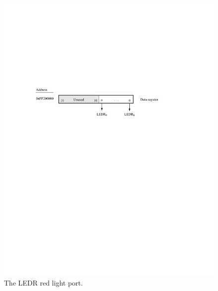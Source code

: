 \documentclass[epsfig,10pt,fullpage]{article}
\begin{document}
\begin{figure}[H]
   \begin{center}
       \includegraphics{figures/fig_LED_port.pdf}
   \end{center}
	\caption{The LEDR red light port.}
\label{fig:LEDR}

\end{figure}
\end{document}
